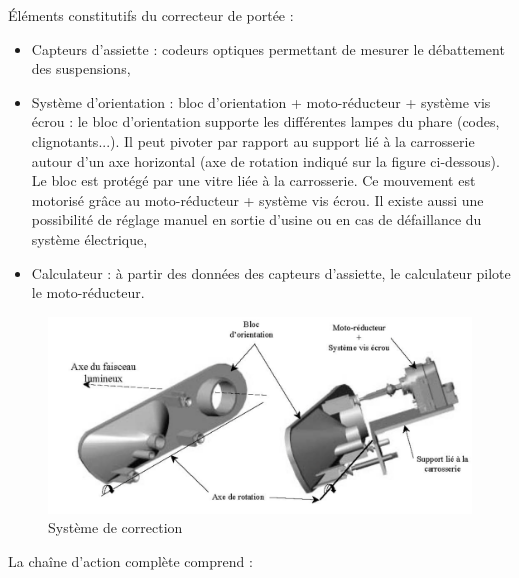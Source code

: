 Éléments constitutifs du correcteur de portée :
\begin{itemize}
 \item Capteurs d'assiette : codeurs optiques permettant de mesurer le débattement des suspensions,
 \item Système d'orientation : bloc d'orientation + moto-réducteur + système vis écrou : le bloc d'orientation supporte les différentes lampes du phare (codes, clignotants...). Il peut pivoter par rapport au support lié à la carrosserie autour d'un axe horizontal (axe de rotation indiqué sur la figure ci-dessous). Le bloc est protégé par une vitre liée à la carrosserie. Ce mouvement est motorisé grâce au moto-réducteur + système vis écrou. Il existe aussi une possibilité de réglage manuel en sortie d'usine ou en cas de défaillance du système électrique,
 \item Calculateur : à partir des données des capteurs d'assiette, le calculateur pilote le moto-réducteur.
\end{itemize}

\newpage

\begin{figure}[!h]
  \centering
  \includegraphics[width=0.8\linewidth]{img/phare2}
  \caption{Système de correction}
  \label{phare2}
\end{figure}

La chaîne d'action complète comprend :


